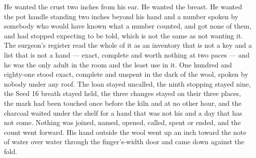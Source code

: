 He wanted the crust two inches from his ear. He wanted the breast. He wanted the pot handle standing two inches beyond his hand and a number spoken by somebody who would have known what a number counted, and got none of them, and had stopped expecting to be told, which is not the same as not wanting it. The surgeon's register read the whole of it as an inventory that is not a key and a list that is not a hand --- exact, complete and worth nothing at two paces --- and he was the only adult in the room and the least use in it. One hundred and eighty-one stood exact, complete and unspent in the dark of the wool, spoken by nobody under any roof. The loan stayed uncalled, the ninth stopping stayed nine, the Seed 16 breath stayed held, the three changes stayed on their three places, the mark had been touched once before the kiln and at no other hour, and the charcoal waited under the shelf for a hand that was not his and a day that has not come. Nothing was joined, named, opened, called, spent or ended, and the count went forward. His hand outside the wool went up an inch toward the note of water over water through the finger's-width door and came down against the fold.
